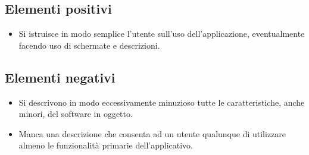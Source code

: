 \documentclass[a4paper,12pt]{report}
\begin{document}
\subsection*{Elementi positivi}

\begin{itemize}
 \item Si istruisce in modo semplice l'utente sull'uso dell'applicazione, eventualmente facendo uso di schermate e descrizioni.
\end{itemize}

\subsection*{Elementi negativi}
\begin{itemize}
 \item Si descrivono in modo eccessivamente minuzioso tutte le caratteristiche, anche minori, del software in oggetto.
 \item Manca una descrizione che consenta ad un utente qualunque di utilizzare almeno le funzionalità primarie dell'applicativo.
\end{itemize}



\end{document}
